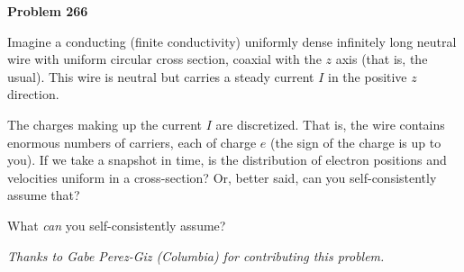 \documentclass[12pt]{article}
\begin{document}
\pagecolor{emcolor}\begin{pottproblem}
\textbf{Problem 266}

Imagine a conducting (finite conductivity) uniformly dense infinitely
long neutral wire with uniform circular cross section, coaxial with the
$z$ axis (that is, the usual).
This wire is neutral but carries a steady current $I$
in the positive $z$ direction.

The charges making up the current $I$ are
discretized.
That is, the wire contains enormous numbers of carriers, each of charge $e$
(the sign of the charge is up to you).
If we take a snapshot in time, is the distribution of
electron positions and velocities uniform in a cross-section?  Or,
better said, can you self-consistently assume that?

What \emph{can} you self-consistently assume?

{\normalsize\emph{Thanks to Gabe Perez-Giz (Columbia) for contributing this problem.}}
\end{pottproblem}
\end{document}
